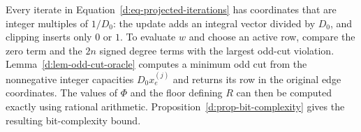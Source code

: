 Every iterate in Equation~\eqref{d:eq-projected-iterations} has coordinates
that are integer multiples of \(1/D_0\): the update adds an integral
vector divided by \(D_0\), and clipping inserts only \(0\) or \(1\).
To evaluate \(w\) and choose an active row, compare the zero term and the
\(2n\) signed degree terms with the largest odd-cut violation.
Lemma~\ref{d:lem-odd-cut-oracle} computes a minimum odd cut from the
nonnegative integer capacities \(D_0x_e^{(j)}\) and returns its row in the
original edge coordinates.  The values of \(\Phi\) and the floor defining
\(R\) can then be computed exactly using rational arithmetic.
Proposition~\ref{d:prop-bit-complexity} gives the resulting bit-complexity
bound.
